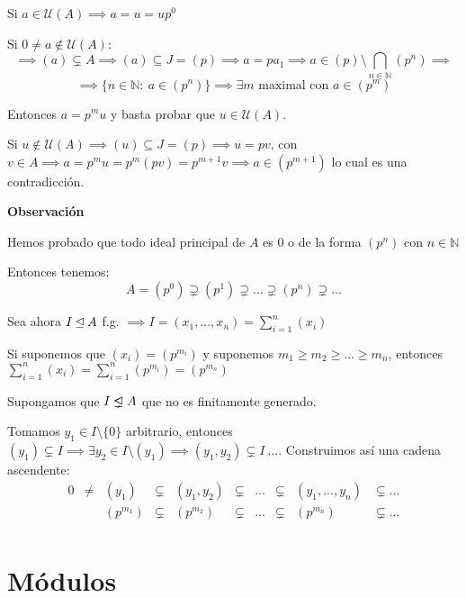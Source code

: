 \documentclass[openany]{book}
\begin{document}
\begin{exercise}
    $  $

    Si $ a \in \mathcal{U}(A    ) \implies a = u = up^{0}$

    Si $ 0 \ne a \not \in \mathcal{U}(A)$:
    $$ \implies (a) \subsetneq A \implies (a) \subseteq J = (p) \implies a = pa_1 \implies a \in (p) \setminus \bigcap_{n \in \mathbb{N}} (p^{n}) \implies $$
    $$ \implies \{n \in \mathbb{N}:\ a \in (p^{n})\} \implies \exists m \text{ maximal con } a \in (p^{m})$$

    Entonces $ a = p^{m}u $ y basta probar que $ u \in \mathcal{U}(A) $.

    Si $ u \not \in \mathcal{U}(A) \implies (u) \subseteq  J = (p) \implies u=pv $, con $ v \in A \implies a = p^{m}u = p^{m}(pv) = p^{m+1}v \implies a \in (p^{m+1})$ lo cual es una contradicción.

    \begin{flushright}
        \textbf{Observación}
    \end{flushright}
    Hemos probado que todo ideal principal de $ A $ es 0 o de la forma $ (p^{n}) $ con $ n \in \mathbb{N} $
    
    Entonces tenemos:
    $$  A = (p^{0}) \supsetneq (p^{1}) \supsetneq ... \supsetneq (p^{n}) \supsetneq ... $$

    Sea ahora $ I \unlhd A $ f.g. $ \implies I = (x_1,...,x_n) = \sum\limits_{i=1}^{n} (x_i)  $
    
    Si suponemos que $ (x_i) = (p^{m_i}) $ y suponemos $ m_1 \geq  m_2 \geq  ... \geq  m_{n} $, entonces $ \sum\limits_{i=1}^{n}(x_i) = \sum\limits_{i=1}^{n} (p^{m_i}) = (p^{m_n}) $

    Supongamos que $ I \properideal A $ que no es finitamente generado.

    Tomamos $ y_1 \in I \setminus \{0\} $ arbitrario, entonces $ (y_1) \subsetneq I \implies \exists y_2 \in I \setminus (y_1) \implies (y_1,y_2) \subsetneq I\ ...$. Construimos así una cadena ascendente:
    $$
    \begin{aligned}
        0&\ne&(y_1)&\subsetneq&(y_1,y_2)&\subsetneq&...&\subsetneq&(y_1,...,y_n)&\subsetneq... \\
        & & (p^{m_1})& \subsetneq &  (p^{m_2}) & \subsetneq&...&\subsetneq&(p^{m_{n}})&\subsetneq... \\ 
    \end{aligned}
    $$
\end{exercise}

\setcounter{chapter}{3}
\chapter{Módulos}
\end{document}
